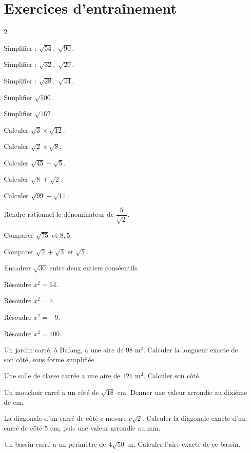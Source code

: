\section{Exercices d'entraînement}
\begin{multicols}{2}

\exo{} Simplifier : $\sqrt{54}$,\ $\sqrt{90}$.

\exo{} Simplifier : $\sqrt{32}$,\ $\sqrt{20}$.

\exo{} Simplifier : $\sqrt{28}$,\ $\sqrt{44}$.

\exo{} Simplifier $\sqrt{500}$.

\exo{} Simplifier $\sqrt{162}$.

\exo{} Calculer $\sqrt3\times\sqrt{12}$.

\exo{} Calculer $\sqrt2\times\sqrt8$.

\exo{} Calculer $\sqrt{45}-\sqrt5$.

\exo{} Calculer $\sqrt8+\sqrt2$.

\exo{} Calculer $\sqrt{99}\div\sqrt{11}$.

\exo{} Rendre rationnel le dénominateur de $\dfrac5{\sqrt2}$.

\exo{} Comparer $\sqrt{75}$ et $8{,}5$.

\exo{} Comparer $\sqrt2+\sqrt3$ et $\sqrt5$.

\exo{} Encadrer $\sqrt{30}$ entre deux entiers consécutifs.

\exo{} Résoudre $x^{2}=64$.

\exo{} Résoudre $x^{2}=7$.

\exo{} Résoudre $x^{2}=-9$.

\exo{} Résoudre $x^{2}=100$.

\exo{} Un jardin carré, à Bafang, a une aire de $98\text{ m}^2$. Calculer la
longueur exacte de son côté, sous forme simplifiée.

\exo{} Une salle de classe carrée a une aire de $121\text{ m}^2$. Calculer son côté.

\exo{} Un mouchoir carré a un côté de $\sqrt{18}$ cm. Donner une valeur arrondie au
dixième de cm.

\exo{} La diagonale d'un carré de côté $c$ mesure $c\sqrt2$. Calculer la diagonale
exacte d'un carré de côté $5$ cm, puis une valeur arrondie au mm.

\exo{} Un bassin carré a un périmètre de $4\sqrt{50}$ m. Calculer l'aire exacte de
ce bassin.

\end{multicols}

